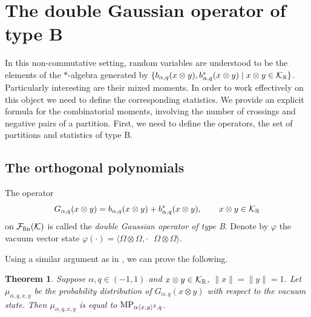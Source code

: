 \documentclass[pdftex]{sigma}
\numberwithin{equation}{section}
\newtheorem{Theorem}{Theorem}[section]
\def\R{{\mathbb R}}
\def\B{b_{\s,\q}}
\def\G{G_{\s,\q}}
\def\F{\mathcal{F}_{\rm fin}(\HH)}
\def\state {\varphi}
\def\m{\mu_{\s,\q,x,y}}
\def\qMP{{\rm MP}}
\def\HH{{\bf \mathcal K}}
\newcommand{\q}{q}
\newcommand{\s}{\alpha}%
\begin{document}
\section{The double Gaussian operator of type B }
In this non-commutative setting, random variables are understood to be the elements of the
$\ast$-algebra generated by $\{\B(x\otimes y) ,\B^\ast(x\otimes y)\mid x\otimes y \in \HH_\R\}$. Particularly interesting are their mixed moments.
In order to work effectively on this object we need to define the corresponding statistics. We provide an explicit formula for the combinatorial moments, involving the number of crossings and negative pairs of a partition. First, we need to define the operators, the set of partitions and statistics of type B.

\subsection{The orthogonal polynomials}
\begin{Definition}
	The operator
	\begin{equation*}
		\G(x\otimes y)= \B(x\otimes y) +\B^\ast(x\otimes y),\qquad x\otimes y \in \HH_\R
	\end{equation*}
	on $\F$ is called the \emph{double Gaussian operator of type B}.
Denote by $\state$ the vacuum vector state $\state(\cdot)=\langle\Omega \otimes \Omega, \cdot\text{ } \Omega\otimes \Omega\rangle$.
\end{Definition}

Using a similar argument as in \cite[Theorem 3.3]{BozejkoEjsmontHasebe2015}, we can prove the following.

\begin{Theorem}
Suppose $\s,\q\in(-1,1)$ and $x\otimes y \in \HH_\R$, $\|x\|=\|y\|=1$. Let $\m$ be the probability distribution of $\G(x\otimes y)$ with respect to the vacuum state. Then $\m$ is equal to $\qMP_{\s\langle x,y\rangle^2,\q}$.
\end{Theorem}
\end{document}
